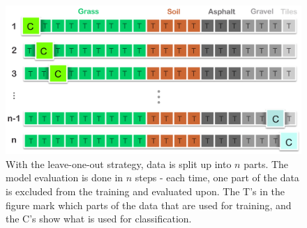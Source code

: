 



\begin{figure}[h]
	\label{fig:loo}
	\centering
	\includegraphics[scale=0.3]{figs_temp/loo.jpg}
	\caption{With the leave-one-out strategy, data is split up into $n$ parts. The model evaluation is done in $n$ steps - each time, one part of the data is excluded from the training and evaluated upon. The T's in the figure mark which parts of the data that are used for training, and the C's show what is used for classification.}
\end{figure}

